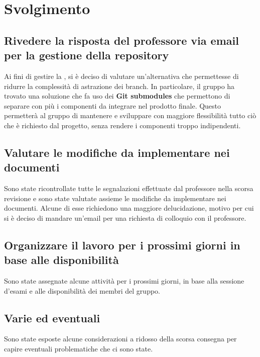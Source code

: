\newpage
\section*{Svolgimento}

	\subsection*{Rivedere la risposta del professore via email per la gestione della repository}
		Ai fini di gestire la , si è deciso di valutare un'alternativa che permettesse di ridurre la complessità di astrazione dei branch. In particolare, il gruppo ha trovato una soluzione che fa uso dei \textbf{Git submodules} che permettono di separare con più  i componenti da integrare nel prodotto finale. Questo permetterà al gruppo di mantenere e sviluppare con maggiore flessibilità tutto ciò che è richiesto dal progetto, senza rendere i componenti troppo indipendenti.
		
	\subsection*{Valutare le modifiche da implementare nei documenti}
		Sono state ricontrollate tutte le segnalazioni effettuate dal professore nella scorsa revisione e sono state valutate assieme le modifiche da implementare nei documenti. Alcune di esse richiedono una maggiore delucidazione, motivo per cui si è deciso di mandare un'email per una richiesta di colloquio con il professore.

	\subsection*{Organizzare il lavoro per i prossimi giorni in base alle disponibilità}
		Sono state assegnate alcune attività per i prossimi giorni, in base alla sessione d'esami e alle disponibilità dei membri del gruppo.

	\subsection*{Varie ed eventuali}
		Sono state esposte alcune considerazioni a ridosso della scorsa consegna per capire eventuali problematiche che ci sono state.
